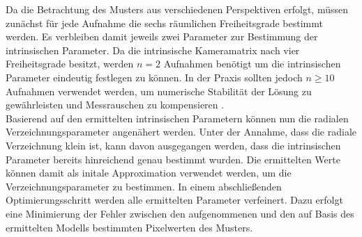 Da die Betrachtung des Musters aus verschiedenen Perspektiven erfolgt, müssen zunächst für jede Aufnahme die sechs räumlichen Freiheitsgrade bestimmt werden. Es verbleiben damit jeweils zwei Parameter zur Bestimmung der intrinsischen Parameter. Da die intrinsische Kameramatrix nach  vier Freiheitsgrade besitzt, werden $n = 2$ Aufnahmen benötigt um die intrinsischen Parameter eindeutig festlegen zu können. In der Praxis sollten jedoch $n \geq 10$ Aufnahmen verwendet werden, um numerische Stabilität der Lösung zu gewährleisten und Messrauschen zu kompensieren \cite{Bradsky2008}.\\


Basierend auf den ermittelten intrinsischen Parametern können nun die radialen Verzeichnungsparameter angenähert werden. Unter der Annahme, dass die radiale Verzeichnung klein ist, kann davon ausgegangen werden, dass die intrinsischen Parameter bereits hinreichend genau bestimmt wurden. Die ermittelten Werte können damit als initale Approximation verwendet werden, um die Verzeichnungsparameter zu bestimmen. In einem abschließenden Optimierungsschritt werden alle ermittelten Parameter verfeinert. Dazu erfolgt eine Minimierung der Fehler zwischen den aufgenommenen und den auf Basis des ermittelten Modells bestimmten Pixelwerten des Musters.




